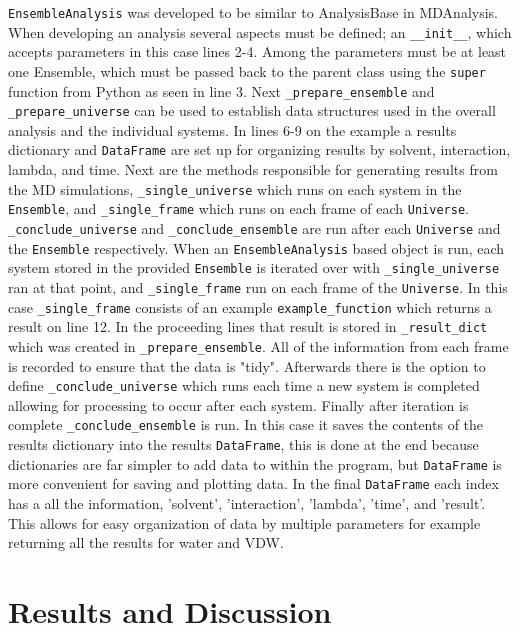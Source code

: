 \documentclass{article}[letterpaper, margins=1in, 12pt]
\begin{document}
\texttt{EnsembleAnalysis} was developed to be similar to AnalysisBase in MDAnalysis. When developing an analysis several aspects must be defined; an \lstinline{__init__}, which accepts parameters in this case lines 2-4. Among the parameters must be at least one Ensemble, which must be passed back to the parent class using the \lstinline{super} function from Python as seen in line 3. Next \lstinline{_prepare_ensemble} and \lstinline{_prepare_universe} can be used to establish data structures used in the overall analysis and the individual systems. In lines 6-9 on the example a results dictionary and \texttt{DataFrame} are set up for organizing results by solvent, interaction, lambda, and time. Next are the methods responsible for generating results from the MD simulations, \lstinline{_single_universe} which runs on each system in the \texttt{Ensemble}, and \lstinline{_single_frame} which runs on each frame of each \texttt{Universe}. \lstinline{_conclude_universe} and \lstinline{_conclude_ensemble} are run after each \texttt{Universe} and the \texttt{Ensemble} respectively. When an \texttt{EnsembleAnalysis} based object is run, each system stored in the provided \texttt{Ensemble} is iterated over with \lstinline{_single_universe} ran at that point, and \lstinline{_single_frame} run on each frame of the \texttt{Universe}. In this case \lstinline{_single_frame} consists of an example \lstinline{example_function} which returns a result on line 12. In the proceeding lines that result is stored in \lstinline{_result_dict} which was created in \lstinline{_prepare_ensemble}. All of the information from each frame is recorded to ensure that the data is "tidy"\cite{tidy-data}. Afterwards there is the option to define \lstinline{_conclude_universe} which runs each time a new system is completed allowing for processing to occur after each system. Finally after iteration is complete \lstinline{_conclude_ensemble} is run. In this case it saves the contents of the results dictionary into the results \texttt{DataFrame}, this is done at the end because dictionaries are far simpler to add data to within the program, but \texttt{DataFrame} is more convenient for saving and plotting data. In the final \texttt{DataFrame} each index has a all the information, 'solvent', 'interaction', 'lambda', 'time', and 'result'. This allows for easy organization of data by multiple parameters for example returning all the results for water and VDW.

\section{Results and Discussion}
\end{document}
